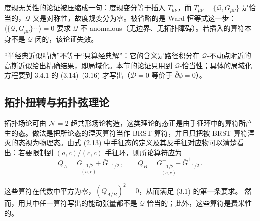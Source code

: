 \begin{yizhu}[含糊点]
度规无关性的论证被压缩成一句：度规变分等于插入 $T_{\mu\nu}$，而 $T_{\mu\nu}=\{\mathcal{Q},G_{\mu\nu}\}$ 是恰当的，$\mathcal{Q}$ 又是对称性，故度规变分为零。被省略的是 Ward 恒等式这一步：$\langle\{\mathcal{Q},G_{\mu\nu}\}\cdots\rangle=0$ 要求 $\mathcal{Q}$ 不 anomalous（无边界、无拓扑障碍）。若插入的算符本身不是 $\mathcal{Q}$-闭的，该论证失效。
\end{yizhu}

\begin{yizhu}[易错点]
“半经典近似精确”不等于“只算经典解”：它的含义是路径积分在 $\mathcal{Q}$-不动点附近的高斯近似给出精确结果，即局域化。本节的论证只用到 $\mathcal{Q}$-恰当性；具体的局域化方程要到 3.4.1 的 (3.14)--(3.16) 才写出（$\mathcal{D}=0$ 等价于 $\bar\partial\phi=0$）。
\end{yizhu}


\subsection{拓扑扭转与拓扑弦理论}
\label{sec:3.2}

拓扑场论可由 $\mathcal{N}=2$ 超共形场论构造，这类理论的态正是由手征环中的算符所产生的态。做法是把所论态的湮灭算符当作 BRST 算符，并且只把被 BRST 算符湮灭的态视为物理态。由式 (2.13) 中手征态的定义及其反手征对应物可以清楚看出：若要限制到 $(a,c)/(c,c)$ 手征环，则所论算符应为
\begin{equation}\tag{3.1}
\underset{(a,c)}{Q_A=G^{-}_{-1/2}+\bar G^{+}_{-1/2}}\,,\qquad
\underset{(c,c)}{Q_B=G^{+}_{-1/2}+\bar G^{+}_{-1/2}}\,.
\end{equation}

这些算符在代数中平方为零，$(Q_{A/B})^2=0$，从而满足 (3.1) 的第一条要求。%
然而，用其中任一算符写出的能动张量都不是 $\mathcal{Q}$ 恰当的；此外，这些算符是费米性的。

